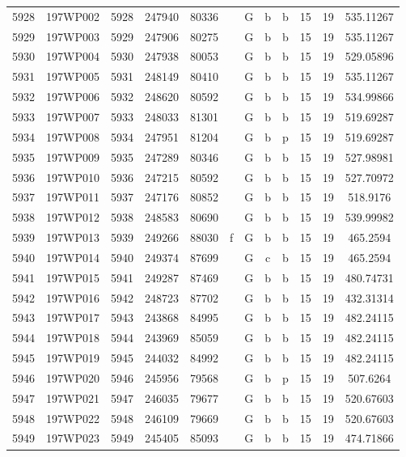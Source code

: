 \begin{tabular}{|*{12}{c|}}
5928 & 197WP002 & 5928 & 247940 & 80336 &  & G & b & b & 15 & 19 & 535.11267 \\ 
5929 & 197WP003 & 5929 & 247906 & 80275 &  & G & b & b & 15 & 19 & 535.11267 \\ 
5930 & 197WP004 & 5930 & 247938 & 80053 &  & G & b & b & 15 & 19 & 529.05896 \\ 
5931 & 197WP005 & 5931 & 248149 & 80410 &  & G & b & b & 15 & 19 & 535.11267 \\ 
5932 & 197WP006 & 5932 & 248620 & 80592 &  & G & b & b & 15 & 19 & 534.99866 \\ 
5933 & 197WP007 & 5933 & 248033 & 81301 &  & G & b & b & 15 & 19 & 519.69287 \\ 
5934 & 197WP008 & 5934 & 247951 & 81204 &  & G & b & p & 15 & 19 & 519.69287 \\ 
5935 & 197WP009 & 5935 & 247289 & 80346 &  & G & b & b & 15 & 19 & 527.98981 \\ 
5936 & 197WP010 & 5936 & 247215 & 80592 &  & G & b & b & 15 & 19 & 527.70972 \\ 
5937 & 197WP011 & 5937 & 247176 & 80852 &  & G & b & b & 15 & 19 & 518.9176 \\ 
5938 & 197WP012 & 5938 & 248583 & 80690 &  & G & b & b & 15 & 19 & 539.99982 \\ 
5939 & 197WP013 & 5939 & 249266 & 88030 & f & G & b & b & 15 & 19 & 465.2594 \\ 
5940 & 197WP014 & 5940 & 249374 & 87699 &  & G & c & b & 15 & 19 & 465.2594 \\ 
5941 & 197WP015 & 5941 & 249287 & 87469 &  & G & b & b & 15 & 19 & 480.74731 \\ 
5942 & 197WP016 & 5942 & 248723 & 87702 &  & G & b & b & 15 & 19 & 432.31314 \\ 
5943 & 197WP017 & 5943 & 243868 & 84995 &  & G & b & b & 15 & 19 & 482.24115 \\ 
5944 & 197WP018 & 5944 & 243969 & 85059 &  & G & b & b & 15 & 19 & 482.24115 \\ 
5945 & 197WP019 & 5945 & 244032 & 84992 &  & G & b & b & 15 & 19 & 482.24115 \\ 
5946 & 197WP020 & 5946 & 245956 & 79568 &  & G & b & p & 15 & 19 & 507.6264 \\ 
5947 & 197WP021 & 5947 & 246035 & 79677 &  & G & b & b & 15 & 19 & 520.67603 \\ 
5948 & 197WP022 & 5948 & 246109 & 79669 &  & G & b & b & 15 & 19 & 520.67603 \\ 
5949 & 197WP023 & 5949 & 245405 & 85093 &  & G & b & b & 15 & 19 & 474.71866 \\ 

\end{tabular}
